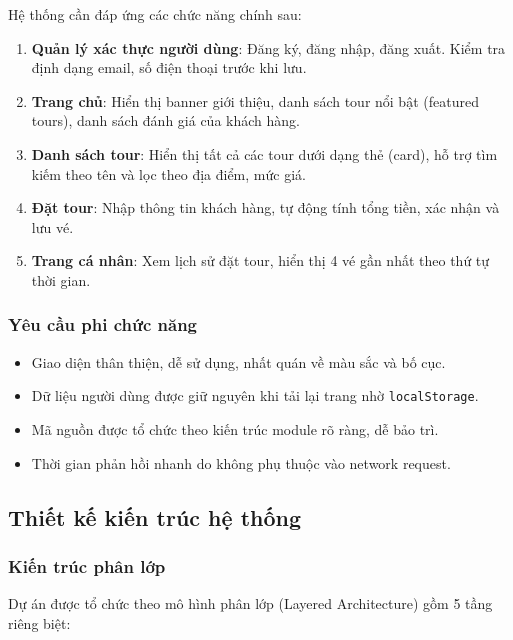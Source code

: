 \documentclass[12pt,a4paper]{article}
\begin{document}
Hệ thống cần đáp ứng các chức năng chính sau:

\begin{enumerate}[leftmargin=2cm]
  \item \textbf{Quản lý xác thực người dùng}: Đăng ký, đăng nhập, đăng xuất. Kiểm tra định dạng email, số điện thoại trước khi lưu.
  \item \textbf{Trang chủ}: Hiển thị banner giới thiệu, danh sách tour nổi bật (featured tours), danh sách đánh giá của khách hàng.
  \item \textbf{Danh sách tour}: Hiển thị tất cả các tour dưới dạng thẻ (card), hỗ trợ tìm kiếm theo tên và lọc theo địa điểm, mức giá.
  \item \textbf{Đặt tour}: Nhập thông tin khách hàng, tự động tính tổng tiền, xác nhận và lưu vé.
  \item \textbf{Trang cá nhân}: Xem lịch sử đặt tour, hiển thị 4 vé gần nhất theo thứ tự thời gian.
\end{enumerate}

\subsubsection{Yêu cầu phi chức năng}

\begin{itemize}[leftmargin=2cm]
  \item Giao diện thân thiện, dễ sử dụng, nhất quán về màu sắc và bố cục.
  \item Dữ liệu người dùng được giữ nguyên khi tải lại trang nhờ \texttt{localStorage}.
  \item Mã nguồn được tổ chức theo kiến trúc module rõ ràng, dễ bảo trì.
  \item Thời gian phản hồi nhanh do không phụ thuộc vào network request.
\end{itemize}

\subsection{Thiết kế kiến trúc hệ thống}

\subsubsection{Kiến trúc phân lớp}

Dự án được tổ chức theo mô hình phân lớp (Layered Architecture) gồm 5 tầng riêng biệt:
\end{document}
